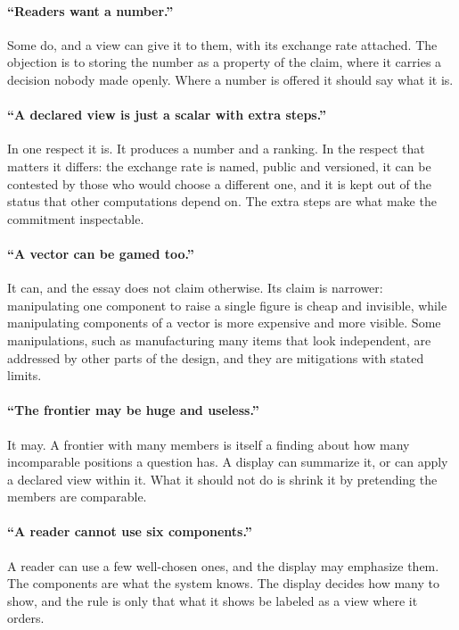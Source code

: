 \documentclass[11pt]{article}
\begin{document}
\paragraph{``Readers want a number.''} Some do, and a view can give it to them, with its exchange rate attached. The objection is to storing the number as a property of the claim, where it carries a decision nobody made openly. Where a number is offered it should say what it is.

\paragraph{``A declared view is just a scalar with extra steps.''} In one respect it is. It produces a number and a ranking. In the respect that matters it differs: the exchange rate is named, public and versioned, it can be contested by those who would choose a different one, and it is kept out of the status that other computations depend on. The extra steps are what make the commitment inspectable.

\paragraph{``A vector can be gamed too.''} It can, and the essay does not claim otherwise. Its claim is narrower: manipulating one component to raise a single figure is cheap and invisible, while manipulating components of a vector is more expensive and more visible. Some manipulations, such as manufacturing many items that look independent, are addressed by other parts of the design, and they are mitigations with stated limits.

\paragraph{``The frontier may be huge and useless.''} It may. A frontier with many members is itself a finding about how many incomparable positions a question has. A display can summarize it, or can apply a declared view within it. What it should not do is shrink it by pretending the members are comparable.

\paragraph{``A reader cannot use six components.''} A reader can use a few well-chosen ones, and the display may emphasize them. The components are what the system knows. The display decides how many to show, and the rule is only that what it shows be labeled as a view where it orders.
\end{document}
